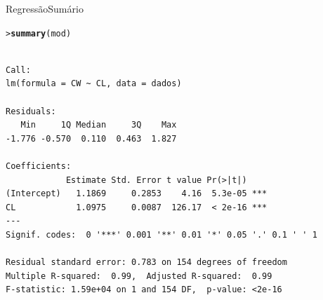 \documentclass[10pt]{beamer}\usepackage[]{graphicx}\usepackage[]{color}
\makeatletter
\newcommand{\hlstd}[1]{\textcolor[rgb]{0.345,0.345,0.345}{#1}}%
\newcommand{\hlkwd}[1]{\textcolor[rgb]{0.282,0.239,0.545}{\textbf{#1}}}%
\newenvironment{kframe}{%
 \def\at@end@of@kframe{}%
 \ifinner\ifhmode%
  \def\at@end@of@kframe{\end{minipage}}%
  \begin{minipage}{\columnwidth}%
 \fi\fi%
 \def\FrameCommand##1{\hskip\@totalleftmargin \hskip-\fboxsep
 \colorbox{shadecolor}{##1}\hskip-\fboxsep
     \hskip-\linewidth \hskip-\@totalleftmargin \hskip\columnwidth}%
 \MakeFramed {\advance\hsize-\width
   \@totalleftmargin\z@ \linewidth\hsize
   \@setminipage}}%
 {\par\unskip\endMakeFramed%
 \at@end@of@kframe}
\newenvironment{knitrout}{}{} %
\makeatother
\begin{document}
\begin{frame}[fragile=singleslide]{Regressão}{Sumário}
\begin{knitrout}\footnotesize
{}\color{fgcolor}\begin{kframe}
\begin{alltt}
\hlstd{> }\hlkwd{summary}\hlstd{(mod)}
\end{alltt}
\begin{verbatim}

Call:
lm(formula = CW ~ CL, data = dados)

Residuals:
   Min     1Q Median     3Q    Max 
-1.776 -0.570  0.110  0.463  1.827 

Coefficients:
            Estimate Std. Error t value Pr(>|t|)    
(Intercept)   1.1869     0.2853    4.16  5.3e-05 ***
CL            1.0975     0.0087  126.17  < 2e-16 ***
---
Signif. codes:  0 '***' 0.001 '**' 0.01 '*' 0.05 '.' 0.1 ' ' 1

Residual standard error: 0.783 on 154 degrees of freedom
Multiple R-squared:  0.99,	Adjusted R-squared:  0.99 
F-statistic: 1.59e+04 on 1 and 154 DF,  p-value: <2e-16
\end{verbatim}
\end{kframe}
\end{knitrout}

\end{frame}
\end{document}
